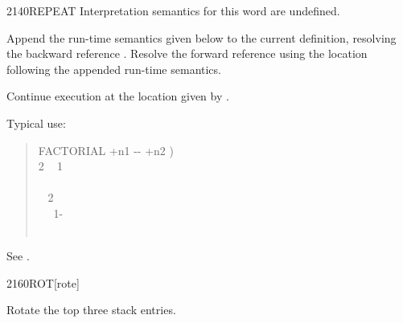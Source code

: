 \begin{worddef}{2140}{REPEAT}
\interpret
	Interpretation semantics for this word are undefined.

\compile

	Append the run-time semantics given below to the current
	definition, resolving the backward reference .
	Resolve the forward reference  using the location
	following the appended run-time semantics.

\runtime
	\stack{}{}

	Continue execution at the location given by .


	\begin{rationale} %
		Typical use:
		\begin{quote}\ttfamily
			\word{:} FACTORIAL  +n1 -{}- +n2 ) \\
			\tab {} 2  ~
				 1 ~  \\
			\tab {} \\
			\tab {}~  2   \\
			\tab~~ 1- ~  \word{*}~  \\
			\tab {}  \\
			\word{;}
		\end{quote}
	\end{rationale}

	\begin{testing} %
		See .
	\end{testing}
\end{worddef}


\begin{worddef}{2160}{ROT}[rote]
\item {}

	Rotate the top three stack entries.

	\begin{testing} %
	\end{testing}
\end{worddef}


